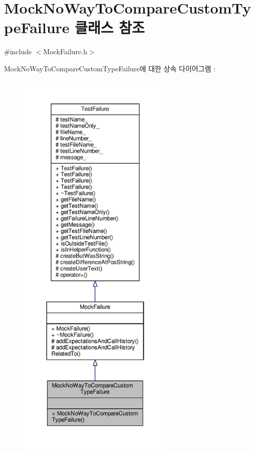 \hypertarget{class_mock_no_way_to_compare_custom_type_failure}{}\section{Mock\+No\+Way\+To\+Compare\+Custom\+Type\+Failure 클래스 참조}
\label{class_mock_no_way_to_compare_custom_type_failure}


{\ttfamily \#include $<$Mock\+Failure.\+h$>$}



Mock\+No\+Way\+To\+Compare\+Custom\+Type\+Failure에 대한 상속 다이어그램 \+: 
\nopagebreak
\begin{figure}[H]
\begin{center}
\leavevmode
\includegraphics[height=550pt]{class_mock_no_way_to_compare_custom_type_failure__inherit__graph}
\end{center}
\end{figure}


